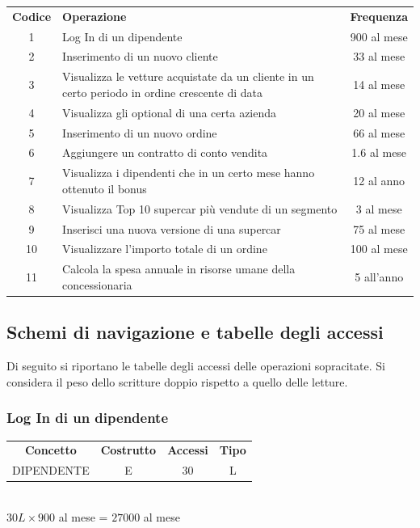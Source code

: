 \documentclass[11pt]{article}
\begin{document}
\begin{table}[htbp]
    \centering
    \small
    \begin{tabularx}{\linewidth}{c X c}
      \rowcolor{red!20!}
      \textbf{Codice} & \textbf{Operazione} & \textbf{Frequenza} \\
      1 & Log In di un dipendente & 900 al mese \\
      2 & Inserimento di un nuovo cliente & 33 al mese \\
      3 & Visualizza le vetture acquistate da un cliente in un certo periodo in
      ordine crescente di data & 14 al mese \\
      4 & Visualizza gli optional di una certa azienda & 20 al mese \\
      5 & Inserimento di un nuovo ordine & 66 al mese \\
      6 & Aggiungere un contratto di conto vendita & 1.6 al mese \\
      7 & Visualizza i dipendenti che in un certo mese hanno ottenuto il bonus & 12
      al anno \\
      8 & Visualizza Top 10 supercar più vendute di un segmento & 3 al mese \\
      9 & Inserisci una nuova versione di una supercar & 75 al mese \\
      10 & Visualizzare l'importo totale di un ordine & 100 al mese \\
      11 & Calcola la spesa annuale in risorse umane della concessionaria & 5 all'anno \\
    \end{tabularx}
    \label{tab:tabella_frequenze}
\end{table}
\subsection{Schemi di navigazione e tabelle degli accessi}

Di seguito si riportano le tabelle degli accessi delle operazioni sopracitate.
Si considera il peso dello scritture doppio rispetto a quello delle letture.

\subsubsection{Log In di un dipendente}

\begin{table}[H]
    \centering
    \begin{tabular}{ c c c c }
        \rowcolor{red!20!}
        \textbf{Concetto} & \textbf{Costrutto} & \textbf{Accessi} &
        \textbf{Tipo}\\
        DIPENDENTE & E & 30 & L \\
    \end{tabular}\\
    \( 30L \times 900 \) al mese = \( 27000 \) al mese 
\end{table}
\end{document}
